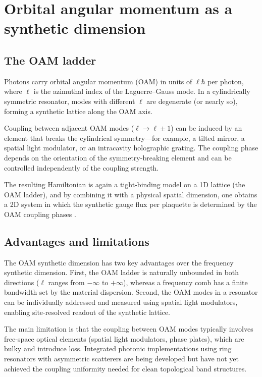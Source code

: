 \section{Orbital angular momentum as a synthetic dimension}
\label{sec:ch16-oam-expanded}

\subsection{The OAM ladder}
\label{sec:ch16-oam-ladder}

Photons carry orbital angular momentum (OAM) in units of $\ell\hbar$
per photon, where $\ell$ is the azimuthal index of the Laguerre--Gauss
mode.  In a cylindrically symmetric resonator, modes with different
$\ell$ are degenerate (or nearly so), forming a synthetic lattice
along the OAM axis.

Coupling between adjacent OAM modes ($\ell\to\ell\pm 1$) can be
induced by an element that breaks the cylindrical symmetry---for
example, a tilted mirror, a spatial light modulator, or an
intracavity holographic grating.  The coupling phase depends on the
orientation of the symmetry-breaking element and can be controlled
independently of the coupling strength.

The resulting Hamiltonian is again a tight-binding model on a 1D
lattice (the OAM ladder), and by combining it with a physical
spatial dimension, one obtains a 2D system in which the synthetic
gauge flux per plaquette is determined by the OAM coupling phases
\cite{ozawa2018topological,kim2020recent}.

\subsection{Advantages and limitations}
\label{sec:ch16-oam-advantages}

The OAM synthetic dimension has two key advantages over the frequency
synthetic dimension.  First, the OAM ladder is naturally unbounded
in both directions ($\ell$ ranges from $-\infty$ to $+\infty$),
whereas a frequency comb has a finite bandwidth set by the material
dispersion.  Second, the OAM modes in a resonator can be individually
addressed and measured using spatial light modulators, enabling
site-resolved readout of the synthetic lattice.

The main limitation is that the coupling between OAM modes typically
involves free-space optical elements (spatial light modulators, phase
plates), which are bulky and introduce loss.  Integrated photonic
implementations using ring resonators with asymmetric scatterers are
being developed but have not yet achieved the coupling uniformity
needed for clean topological band structures.

